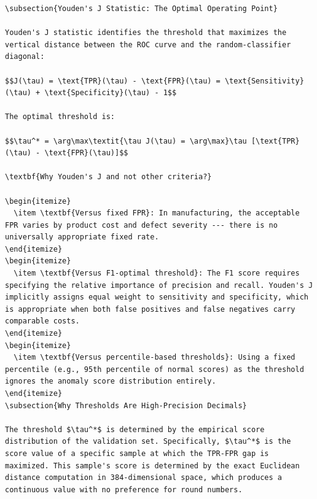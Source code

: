 \documentclass[12pt,a4paper,oneside]{report}
\begin{document}
\begin{verbatim}
\subsection{Youden's J Statistic: The Optimal Operating Point}

Youden's J statistic identifies the threshold that maximizes the vertical distance between the ROC curve and the random-classifier diagonal:

$$J(\tau) = \text{TPR}(\tau) - \text{FPR}(\tau) = \text{Sensitivity}(\tau) + \text{Specificity}(\tau) - 1$$

The optimal threshold is:

$$\tau^* = \arg\max\textit{\tau J(\tau) = \arg\max}\tau [\text{TPR}(\tau) - \text{FPR}(\tau)]$$

\textbf{Why Youden's J and not other criteria?}

\begin{itemize}
  \item \textbf{Versus fixed FPR}: In manufacturing, the acceptable FPR varies by product cost and defect severity --- there is no universally appropriate fixed rate.
\end{itemize}
\begin{itemize}
  \item \textbf{Versus F1-optimal threshold}: The F1 score requires specifying the relative importance of precision and recall. Youden's J implicitly assigns equal weight to sensitivity and specificity, which is appropriate when both false positives and false negatives carry comparable costs.
\end{itemize}
\begin{itemize}
  \item \textbf{Versus percentile-based thresholds}: Using a fixed percentile (e.g., 95th percentile of normal scores) as the threshold ignores the anomaly score distribution entirely.
\end{itemize}
\subsection{Why Thresholds Are High-Precision Decimals}

The threshold $\tau^*$ is determined by the empirical score distribution of the validation set. Specifically, $\tau^*$ is the score value of a specific sample at which the TPR-FPR gap is maximized. This sample's score is determined by the exact Euclidean distance computation in 384-dimensional space, which produces a continuous value with no preference for round numbers.


\end{verbatim}
\end{document}
